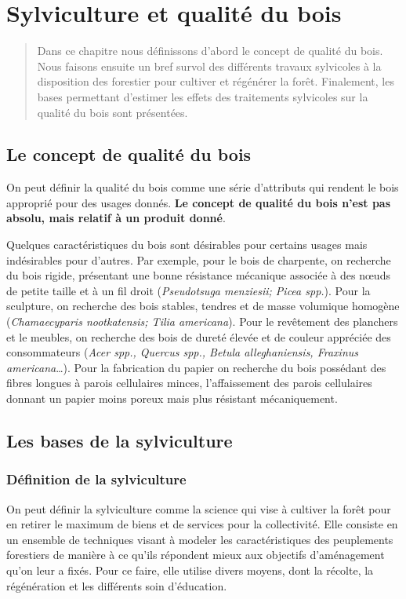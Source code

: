 \chapter{Sylviculture et qualité du bois}

\begin{abstract}
	Dans ce chapitre nous définissons d'abord le concept de qualité du bois. Nous faisons ensuite un bref survol des différents travaux sylvicoles à la disposition des forestier pour cultiver et régénérer la forêt. Finalement, les bases permettant d'estimer les effets des traitements sylvicoles sur la qualité du bois sont présentées.
\end{abstract}

\minitoc

\section{Le concept de qualité du bois}

On peut définir la qualité du bois comme une série d’attributs qui rendent le bois approprié pour des usages donnés. \textbf{Le concept de \og qualité \fg du bois n'est pas absolu, mais relatif à un produit donné}.

Quelques caractéristiques du bois sont désirables pour certains usages mais indésirables pour d’autres. Par exemple, pour le bois de charpente, on recherche du bois rigide, présentant une bonne résistance mécanique associée à des nœuds de petite taille et à un fil droit (\textit{Pseudotsuga menziesii; Picea spp.}). Pour la sculpture, on recherche des bois stables, tendres et de masse volumique homogène (\textit{Chamaecyparis nootkatensis; Tilia americana}). Pour le revêtement des planchers et le meubles, on recherche des bois de dureté élevée et de couleur appréciée des consommateurs (\textit{Acer spp., Quercus spp., Betula alleghaniensis, Fraxinus americana}…). Pour la fabrication du papier on recherche du bois possédant des fibres longues à parois cellulaires minces, l’affaissement des parois cellulaires donnant un papier moins poreux mais plus résistant mécaniquement.

\section{Les bases de la sylviculture}
\subsection{Définition de la sylviculture}
On peut définir la sylviculture comme la science qui vise à cultiver la forêt pour en retirer le maximum de biens et de services pour la collectivité. Elle consiste en un ensemble de techniques visant à modeler les caractéristiques des peuplements forestiers de manière à ce qu'ils répondent mieux aux objectifs d'aménagement qu'on leur a fixés. Pour ce faire, elle utilise divers moyens, dont la récolte, la régénération et les différents soin d'éducation. 

